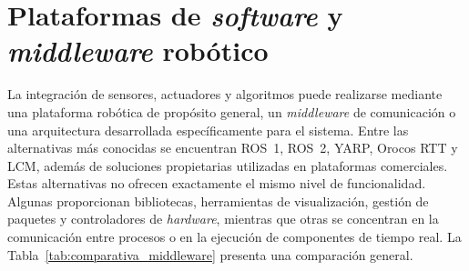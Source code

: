 \section{Plataformas de \texorpdfstring{\textit{software}}{software} y \texorpdfstring{\textit{middleware}}{middleware} robótico}
\label{sec:alternativas_middleware}

La integración de sensores, actuadores y algoritmos puede realizarse mediante
una plataforma robótica de propósito general, un \textit{middleware} de comunicación o
una arquitectura desarrollada específicamente para el sistema. Entre las
alternativas más conocidas se encuentran ROS~1, ROS~2, YARP, Orocos RTT y
LCM, además de soluciones propietarias utilizadas en plataformas comerciales.
Estas alternativas no ofrecen exactamente el mismo nivel de funcionalidad.
Algunas proporcionan bibliotecas, herramientas de visualización, gestión de
paquetes y controladores de \textit{hardware}, mientras que otras se concentran en la
comunicación entre procesos o en la ejecución de componentes de tiempo real.
La Tabla~\ref{tab:comparativa_middleware} presenta una comparación general.

